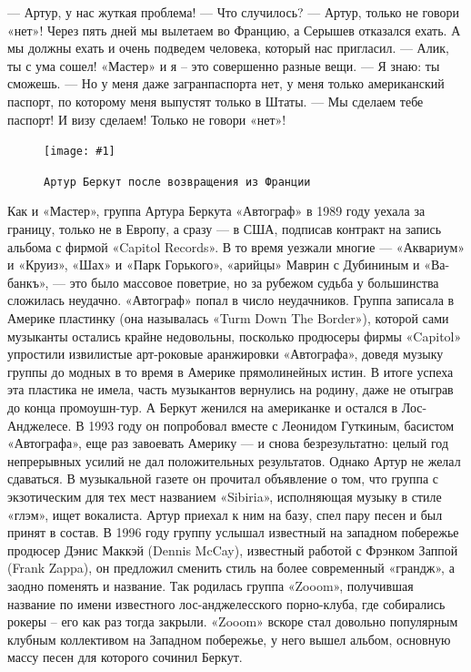 \documentclass[16pt,a5paper]{book}
\newcommand{\myincludegraphics}[1]{\texttt{[image: \#1]}}
\begin{document}
— Артур, у нас жуткая проблема!
— Что случилось?
— Артур, только не говори «нет»! Через пять дней мы вылетаем во Францию, а Серышев отказался ехать. А мы должны ехать и
очень подведем человека, который нас пригласил.
— Алик, ты с ума сошел! «Мастер» и я – это совершенно разные вещи.
— Я знаю: ты сможешь.
— Но у меня даже загранпаспорта нет, у меня только американский паспорт, по которому меня выпустят только в Штаты.
— Мы сделаем тебе паспорт! И визу сделаем! Только не говори «нет»!

\begin{figure}[h]
    \centering
    \myincludegraphics{Image30}
    \caption{\texttt{Артур Беркут после возвращения из Франции}}
\end{figure}

Как и «Мастер», группа Артура Беркута «Автограф» в 1989 году уехала за границу, только не в Европу, а сразу — в США,
подписав контракт на запись альбома с фирмой «Capitol Records». В то время уезжали многие — «Аквариум» и «Круиз», «Шах»
и «Парк Горького», «арийцы» Маврин с Дубининым и «Ва-банкъ», — это было массовое поветрие, но за рубежом судьба у
большинства сложилась неудачно. «Автограф» попал в число неудачников. Группа записала в Америке пластинку (она
называлась «Turm Down The Border»), которой сами музыканты остались крайне недовольны, посколько продюсеры фирмы
«Capitol» упростили извилистые арт-роковые аранжировки «Автографа», доведя музыку группы до модных в то время в Америке
прямолинейных истин. В итоге успеха эта пластика не имела, часть музыкантов вернулись на родину, даже не отыграв до
конца промоушн-тур. А Беркут женился на американке и остался в Лос-Анджелесе. В 1993 году он попробовал вместе с
Леонидом Гуткиным, басистом «Автографа», еще раз завоевать Америку — и снова безрезультатно: целый год непрерывных
усилий не дал положительных результатов. Однако Артур не желал сдаваться. В музыкальной газете он прочитал объявление о
том, что группа с экзотическим для тех мест названием «Sibiria», исполняющая музыку в стиле «глэм», ищет вокалиста.
Артур приехал к ним на базу, спел пару песен и был принят в состав. В 1996 году группу услышал известный на западном
побережье продюсер Дэнис Маккэй (Dennis McCay), известный работой с Фрэнком Заппой (Frank Zappa), он предложил сменить
стиль на более современный «грандж», а заодно поменять и название. Так родилась группа «Zooom», получившая название по
имени известного лос-анджелесского порно-клуба, где собирались рокеры – его как раз тогда закрыли. «Zooom» вскоре стал
довольно популярным клубным коллективом на Западном побережье, у него вышел альбом, основную массу песен для которого
сочинил Беркут.
\end{document}
